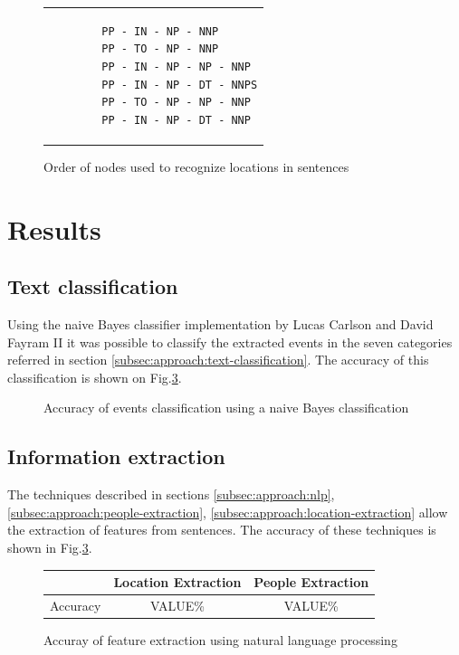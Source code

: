 \documentclass{llncs}
\begin{document}
\begin{figure}[h]
	\centering
	\begin{tabular}{p{4cm}}
		\begin{verbatim}
		PP - IN - NP - NNP
		PP - TO - NP - NNP
		PP - IN - NP - NP - NNP
		PP - IN - NP - DT - NNPS
		PP - TO - NP - NP - NNP
		PP - IN - NP - DT - NNP
		\end{verbatim}
	\end{tabular}
	\caption{Order of nodes used to recognize locations in sentences}
	\label{fig:nodes-order}
\end{figure}

\section{Results}

\subsection{Text classification}

Using the naive Bayes classifier implementation by Lucas Carlson and David Fayram II\cite{classifier} it was possible to classify the extracted events in the seven categories referred in section \ref{subsec:approach:text-classification}. The accuracy of this classification is shown on Fig.\ref{fig:classifier-accuracy}.

\begin{figure}[h]
	\caption{Accuracy of events classification using a naive Bayes classification}
	\label{fig:classifier-accuracy}
\end{figure}

\subsection{Information extraction}

The techniques described in sections \ref{subsec:approach:nlp}, \ref{subsec:approach:people-extraction}, \ref{subsec:approach:location-extraction} allow the extraction of features from sentences. The accuracy of these techniques is shown in Fig.\ref{fig:classifier-accuracy}.

\begin{figure}[h]
	\centering
	\begin{tabular}{c|c|c}
		& Location Extraction & People Extraction\\
		\hline
		Accuracy & VALUE\% & VALUE\% \\
	\end{tabular}
	\caption{Accuray of feature extraction using natural language processing}
	\label{fig:classifier-accuracy}
\end{figure}
\end{document}
